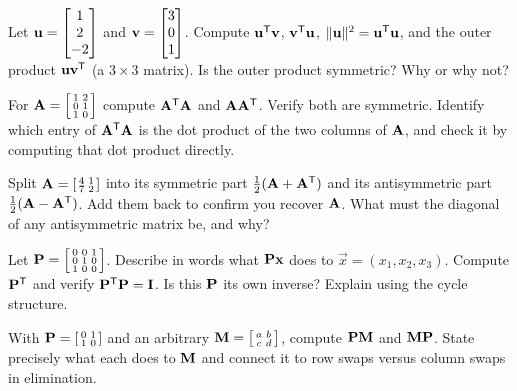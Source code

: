 \begin{exercise}\label{ch10:ex-dotprod}
Let $\mathbf{u}=\begin{bmatrix}1\\2\\-2\end{bmatrix}$ and $\mathbf{v}=\begin{bmatrix}3\\0\\1\end{bmatrix}$. Compute $\mathbf{u}^{\mathsf{T}}\mathbf{v}$,
$\mathbf{v}^{\mathsf{T}}\mathbf{u}$, $\lVert\mathbf{u}\rVert^2=\mathbf{u}^{\mathsf{T}}\mathbf{u}$, and the outer product $\mathbf{u}\mathbf{v}^{\mathsf{T}}$
(a $3\times 3$ matrix). Is the outer product symmetric? Why or why not?
\end{exercise}

\begin{exercise}\label{ch10:ex-gram}
For $\mathbf{A}=\left[\begin{smallmatrix}1&2\\0&1\\1&0\end{smallmatrix}\right]$ compute $\mathbf{A}^{\mathsf{T}}\mathbf{A}$
and $\mathbf{A}\mathbf{A}^{\mathsf{T}}$. Verify both are symmetric. Identify which entry of $\mathbf{A}^{\mathsf{T}}\mathbf{A}$ is the
dot product of the two columns of $\mathbf{A}$, and check it by computing that dot product directly.
\end{exercise}

\begin{exercise}\label{ch10:ex-split}
Split $\mathbf{A}=\left[\begin{smallmatrix}4&1\\7&2\end{smallmatrix}\right]$ into its symmetric part
$\tfrac12(\mathbf{A}+\mathbf{A}^{\mathsf{T}})$ and its antisymmetric part $\tfrac12(\mathbf{A}-\mathbf{A}^{\mathsf{T}})$. Add them back
to confirm you recover $\mathbf{A}$. What must the diagonal of any antisymmetric matrix be, and why?
\end{exercise}

\begin{exercise}\label{ch10:ex-permaction}
Let $\mathbf{P}=\left[\begin{smallmatrix}0&0&1\\0&1&0\\1&0&0\end{smallmatrix}\right]$. Describe in words
what $\mathbf{P}\mathbf{x}$ does to $\vec{x}=(x_1,x_2,x_3)$. Compute $\mathbf{P}^{\mathsf{T}}$ and verify
$\mathbf{P}^{\mathsf{T}}\mathbf{P}=\mathbf{I}$. Is this $\mathbf{P}$ its own inverse? Explain using the cycle structure.
\end{exercise}

\begin{exercise}\label{ch10:ex-leftright}
With $\mathbf{P}=\left[\begin{smallmatrix}0&1\\1&0\end{smallmatrix}\right]$ and an arbitrary
$\mathbf{M}=\left[\begin{smallmatrix}a&b\\c&d\end{smallmatrix}\right]$, compute $\mathbf{P}\mathbf{M}$ and
$\mathbf{M}\mathbf{P}$. State precisely what each does to $\mathbf{M}$ and connect it to row swaps versus
column swaps in elimination.
\end{exercise}

